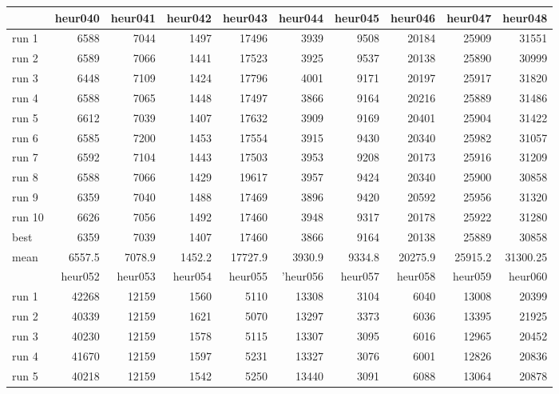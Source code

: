 \documentclass[a4paper,12pt]{article}
\begin{document}
\begin{table}[H]
    \centering
    \begin{tabular}{|l|r|r|r|r|r|r|r|r|r|}
         \hline
         & heur040 & heur041 & heur042 & heur043 & heur044 & heur045 & heur046 & heur047 & heur048 \\
         \hline
         run 1 & 6588 & 7044 & 1497 & 17496 & 3939 & 9508 & 20184 & 25909 & 31551\\
         run 2 & 6589 & 7066 & 1441 & 17523 & 3925 & 9537 & 20138 & 25890 & 30999\\
         run 3 & 6448 & 7109 & 1424 & 17796 & 4001 & 9171 & 20197 & 25917 & 31820\\
         run 4 & 6588 & 7065 & 1448 & 17497 & 3866 & 9164 & 20216 & 25889 & 31486\\
         run 5 & 6612 & 7039 & 1407 & 17632 & 3909 & 9169 & 20401 & 25904 & 31422\\
         run 6 & 6585 & 7200 & 1453 & 17554 & 3915 & 9430 & 20340 & 25982 & 31057\\
         run 7 & 6592 & 7104 & 1443 & 17503 & 3953 & 9208 & 20173 & 25916 & 31209\\
         run 8 & 6588 & 7066 & 1429 & 19617 & 3957 & 9424 & 20340 & 25900 & 30858\\
         run 9 & 6359 & 7040 & 1488 & 17469 & 3896 & 9420 & 20592 & 25956 & 31320\\
        run 10 & 6626 & 7056 & 1492 & 17460 & 3948 & 9317 & 20178 & 25922 & 31280\\
        \hline 
        best   & 6359 & 7039 & 1407 & 17460 & 3866 & 9164 & 20138 & 25889 & 30858\\
        mean   &6557.5&7078.9&1452.2&17727.9&3930.9&9334.8&20275.9&25915.2& 31300.25\\
        \hline
         & heur052 & heur053 & heur054 & heur055 & 'heur056 & heur057 & heur058 & heur059 & heur060 \\
         \hline
         run 1 & 42268 & 12159 & 1560 & 5110 & 13308 & 3104 & 6040 & 13008 & 20399 \\
         run 2 & 40339 & 12159 & 1621 & 5070 & 13297 & 3373 & 6036 & 13395 & 21925 \\
         run 3 & 40230 & 12159 & 1578 & 5115 & 13307 & 3095 & 6016 & 12965 & 20452 \\
         run 4 & 41670 & 12159 & 1597 & 5231 & 13327 & 3076 & 6001 & 12826 & 20836 \\
         run 5 & 40218 & 12159 & 1542 & 5250 & 13440 & 3091 & 6088 & 13064 & 20878 \\

\end{tabular}
\end{table}
\end{document}
